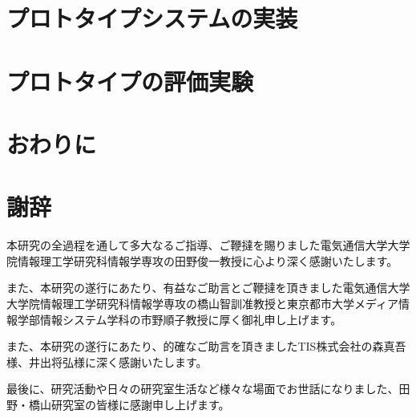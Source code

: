 \documentclass[11pt,a4j, titlepage]{jarticle} %
\begin{document}
\newpage
\section{プロトタイプシステムの実装}

\newpage
\section{プロトタイプの評価実験}

\newpage
\section{おわりに}

\newpage
\section*{謝辞}
本研究の全過程を通して多大なるご指導、ご鞭撻を賜りました電気通信大学大学院情報理工学研究科情報学専攻の田野俊一教授に心より深く感謝いたします。

また、本研究の遂行にあたり、有益なご助言とご鞭撻を頂きました電気通信大学大学院情報理工学研究科情報学専攻の橋山智訓准教授と東京都市大学メディア情報学部情報システム学科の市野順子教授に厚く御礼申し上げます。

また、本研究の遂行にあたり、的確なご助言を頂きましたTIS株式会社の森真吾様、井出将弘様に深く感謝いたします。

最後に、研究活動や日々の研究室生活など様々な場面でお世話になりました、田野・橋山研究室の皆様に感謝申し上げます。
\end{document}
